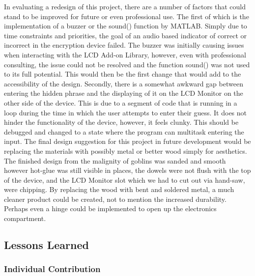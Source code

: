 \documentclass[conference]{IEEEtran}
\begin{document}
\par In evaluating a redesign of this project, there are a number of factors that could stand to be improved for future or even professional use. The first of which is the implementation of a buzzer or the sound() function by MATLAB. Simply due to time constraints and priorities, the goal of an audio based indicator of correct or incorrect in the encryption device failed. The buzzer was initially causing issues when interacting with the LCD Add-on Library, however, even with professional consulting, the issue could not be resolved and the function sound() was not used to its full potential. This would then be the first change that would add to the accessibility of the design. Secondly, there is a somewhat awkward gap between entering the hidden phrase and the displaying of it on the LCD Monitor on the other side of the device. This is due to a segment of code that is running in a loop during the time in which the user attempts to enter their guess. It does not hinder the functionality of the device, however, it feels clunky. This should be debugged and changed to a state where the program can multitask entering the input. The final design suggestion for this project in future development would be replacing the materials with possibly metal or better wood simply for aesthetics. The finished design from the malignity of goblins was sanded and smooth however hot-glue was still visible in places, the dowels were not flush with the top of the device, and the LCD Monitor slot which we had to cut out via hand-saw, were chipping. By replacing the wood with bent and soldered metal, a much cleaner product could be created, not to mention the increased durability. Perhaps even a hinge could be implemented to open up the electronics compartment.

\subsection{Lessons Learned}

\subsubsection{Individual Contribution}
\end{document}
